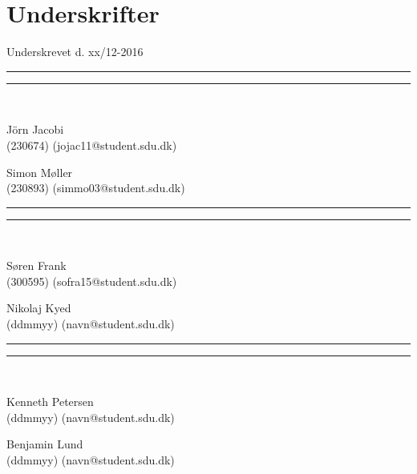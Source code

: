 
\section*{Underskrifter}
\vspace{3ex} \hfill Underskrevet d. xx/12-2016\\

\newlength{\streg} \setlength{\streg}{0.49\linewidth}
\vspace*{\fill} \rule{\streg}{1pt} \hfill \rule{\streg}{1pt}\\
\begin{minipage}[b]{\streg}
 \centering
 \rule{0pt}{4ex}
 J\"{o}rn Jacobi \\
 {\footnotesize (230674) (jojac11@student.sdu.dk)}
\end{minipage}
\hfill
\begin{minipage}[b]{\streg}
 \centering
 Simon Møller \\
 {\footnotesize (230893) (simmo03@student.sdu.dk)}
\end{minipage}

\vspace*{\fill} \rule{\streg}{1pt} \hfill \rule{\streg}{1pt}\\
\begin{minipage}[b]{\streg}
 \centering
 \rule{0pt}{4ex}
 Søren Frank \\
 {\footnotesize (300595) (sofra15@student.sdu.dk)}
\end{minipage}
\hfill
\begin{minipage}[b]{\streg}
 \centering
 Nikolaj Kyed \\
 {\footnotesize (ddmmyy) (navn@student.sdu.dk)}
\end{minipage}

\vspace*{\fill} \rule{\streg}{1pt} \hfill \rule{\streg}{1pt}\\
\begin{minipage}[b]{\streg}
	\centering
	\rule{0pt}{4ex}
	Kenneth Petersen \\
	{\footnotesize (ddmmyy) (navn@student.sdu.dk)}
\end{minipage}
\hfill
\begin{minipage}[b]{\streg}
	\centering
	Benjamin Lund \\
	{\footnotesize (ddmmyy) (navn@student.sdu.dk)}
\end{minipage}
